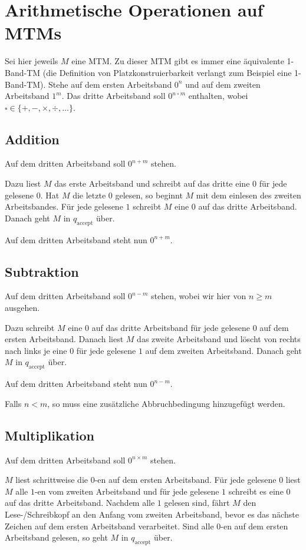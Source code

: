 \section{Arithmetische Operationen auf MTMs}
Sei hier jeweils \(M\) eine MTM. Zu dieser MTM gibt es immer eine äquivalente 1-Band-TM (die Definition von Platzkonstruierbarkeit verlangt zum Beispiel eine 1-Band-TM). Stehe auf dem ersten Arbeitsband \(0^n\) und auf dem zweiten Arbeitsband \(1^m\). Das dritte Arbeitsband soll \(0^{n\ \square\ m}\) enthalten, wobei \(\square \in \{+, -, \times, \div, \ldots\}\).

\subsection{Addition}
Auf dem dritten Arbeitsband soll \(0^{n + m}\) stehen.

Dazu liest \(M\) das erste Arbeitsband und schreibt auf das dritte eine \(0\) für jede gelesene \(0\). Hat \(M\) die letzte \(0\) gelesen, so beginnt \(M\) mit dem einlesen des zweiten Arbeitsbandes. Für jede gelesene \(1\) schreibt \(M\) eine \(0\) auf das dritte Arbeitsband. Danach geht \(M\) in \(q_\text{accept}\) über.

Auf dem dritten Arbeitsband steht nun \(0^{n + m}\).

\subsection{Subtraktion}
Auf dem dritten Arbeitsband soll \(0^{n - m}\) stehen, wobei wir hier von \(n \geq m\) ausgehen.

Dazu schreibt \(M\) eine \(0\) auf das dritte Arbeitsband für jede gelesene \(0\) auf dem ersten Arbeitsband. Danach liest \(M\) das zweite Arbeitsband und löscht von rechts nach links je eine \(0\) für jede gelesene \(1\) auf dem zweiten Arbeitsband. Danach geht \(M\) in \(q_\text{accept}\) über.

Auf dem dritten Arbeitsband steht nun \(0^{n - m}\).

Falls \(n < m\), so muss eine zusätzliche Abbruchbedingung hinzugefügt werden.

\subsection{Multiplikation}
Auf dem dritten Arbeitsband soll \(0^{n \times m}\) stehen.

\(M\) liest schrittweise die \(0\)-en auf dem ersten Arbeitsband. Für jede gelesene \(0\) liest \(M\) alle \(1\)-en vom zweiten Arbeitsband und für jede gelesene \(1\) schreibt es eine \(0\) auf das dritte Arbeitsband. Nachdem alle \(1\) gelesen sind, fährt \(M\) den Lese-/Schreibkopf an den Anfang vom zweiten Arbeitsband, bevor es das nächste Zeichen auf dem ersten Arbeitsband verarbeitet. Sind alle \(0\)-en auf dem ersten Arbeitsband gelesen, so geht \(M\) in \(q_\text{accept}\) über.

